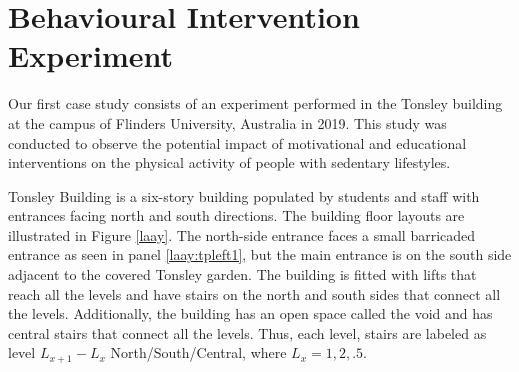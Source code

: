 \section{Behavioural Intervention Experiment}


Our first case study consists of an experiment performed in the Tonsley building at the campus of Flinders University, Australia in 2019. This study was conducted to observe the potential impact of motivational and educational interventions on the physical activity of people with sedentary lifestyles. 








 



Tonsley Building is a six-story building populated by students and staff with entrances facing north and south directions. The building floor layouts are illustrated in Figure \ref{laay}. The north-side entrance faces a small barricaded entrance as seen in panel \ref{laay:tpleft1}, but the main entrance is on the south side adjacent to the covered Tonsley garden. The building is fitted with lifts that reach all the levels and have stairs on the north and south sides that connect all the levels. Additionally, the building has an open space called the void and has central stairs that connect all the levels. Thus, each level, stairs are labeled as level $L_{x+1}-L_x$ North/South/Central, where $L_x = 1,2,.5$. 


